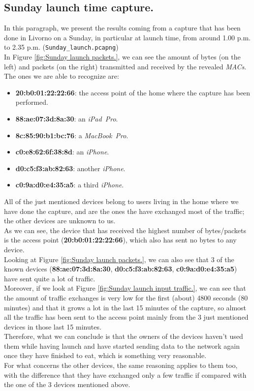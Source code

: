 \subsection{Sunday launch time capture.}
In this paragraph, we present the results coming from a capture that has been done in Livorno on a Sunday, in particular at
launch time, from around 1.00 p.m. to 2.35 p.m. (\texttt{Sunday\_launch.pcapng})\\ 
In Figure \ref{fig:Sunday launch packets.}, we can see the amount of bytes (on the left) and packets (on the right)
transmitted and received by the revealed \textit{MACs}. The ones we are able to recognize are:
\begin{itemize}
    \item \textbf{20:b0:01:22:22:66}: the access point of the home where the capture has been performed.
    \item \textbf{88:ae:07:3d:8a:30}: an \textit{iPad\ Pro}.
    \item \textbf{8c:85:90:b1:bc:76}: a \textit{MacBook\ Pro}.
    \item \textbf{c0:e8:62:6f:38:8d}: an \textit{iPhone}.
    \item \textbf{d0:c5:f3:ab:82:63}: another \textit{iPhone}.
    \item \textbf{c0:9a:d0:e4:35:a5}: a third \textit{iPhone}.
\end{itemize}
All of the just mentioned devices belong to users living in the home where we have done the capture, and are the ones the have
exchanged most of the traffic; the other devices are unknown to us.\\
As we can see, the device that has received the highest number of bytes/packets is the access point (\textbf{20:b0:01:22:22:66}),
which also has sent no bytes to any device. \\
Looking at Figure \ref{fig:Sunday launch packets.}, we can also see that 3 of the known devices (\textbf{88:ae:07:3d:8a:30}, 
\textbf{d0:c5:f3:ab:82:63}, \textbf{c0:9a:d0:e4:35:a5}) have sent quite a lot of traffic.\\
Moreover, if we look at Figure \ref{fig:Sunday launch input traffic.}, we can see that the amount of traffic exchanges is very
low for the first (about) 4800 seconds (80 minutes) and that it grows a lot in the last 15 minutes of the capture, so almost all the 
traffic has been sent to the access point mainly from the 3 just mentioned devices in those last 15 minutes.\\
Therefore, what we can conclude is that the owners of the devices haven't used them while having launch and have started 
sending data to the network again once they have finished to eat, which is something very reasonable.\\
For what concerns the other devices, the same reasoning applies to them too, with the difference that they have exchanged only a 
few traffic if compared with the one of the 3 devices mentioned above. 

